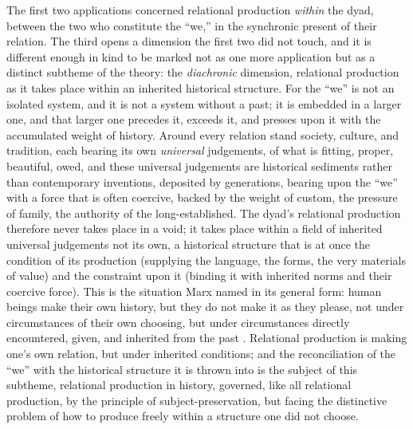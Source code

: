 The first two applications concerned relational production \emph{within} the dyad, between the two who constitute the ``we,'' in the synchronic present of their relation. The third opens a dimension the first two did not touch, and it is different enough in kind to be marked not as one more application but as a distinct subtheme of the theory: the \emph{diachronic} dimension, relational production as it takes place within an inherited historical structure. For the ``we'' is not an isolated system, and it is not a system without a past; it is embedded in a larger one, and that larger one precedes it, exceeds it, and presses upon it with the accumulated weight of history. Around every relation stand society, culture, and tradition, each bearing its own \emph{universal} judgements, of what is fitting, proper, beautiful, owed, and these universal judgements are historical sediments rather than contemporary inventions, deposited by generations, bearing upon the ``we'' with a force that is often coercive, backed by the weight of custom, the pressure of family, the authority of the long-established. The dyad's relational production therefore never takes place in a void; it takes place within a field of inherited universal judgements not its own, a historical structure that is at once the condition of its production (supplying the language, the forms, the very materials of value) and the constraint upon it (binding it with inherited norms and their coercive force). This is the situation Marx named in its general form: human beings make their own history, but they do not make it as they please, not under circumstances of their own choosing, but under circumstances directly encountered, given, and inherited from the past \parencite{marx1963}. Relational production is making one's own relation, but under inherited conditions; and the reconciliation of the ``we'' with the historical structure it is thrown into is the subject of this subtheme, relational production in history, governed, like all relational production, by the principle of subject-preservation, but facing the distinctive problem of how to produce freely within a structure one did not choose.

